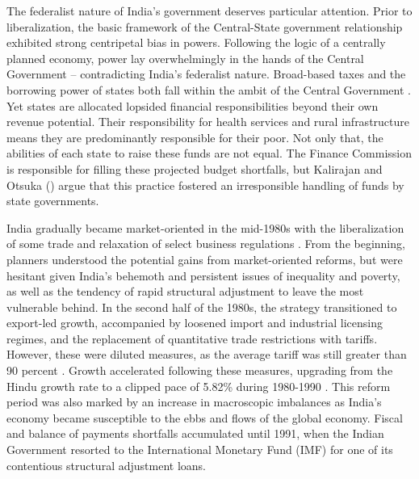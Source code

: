 \documentclass[a4paper, 11pt]{article}
\begin{document}
The federalist nature of India’s government deserves particular attention.  Prior to liberalization, the basic framework of the Central-State government relationship exhibited strong centripetal bias in powers.  Following the logic of a centrally planned economy, power lay overwhelmingly in the hands of the Central Government -- contradicting India’s federalist nature.  Broad-based taxes and the borrowing power of states both fall within the ambit of the Central Government \citep{kalirajan_fiscal_2012}.  Yet states are allocated lopsided financial responsibilities beyond their own revenue potential.  Their responsibility for health services and rural infrastructure means they are predominantly responsible for their poor.  Not only that, the abilities of each state to raise these funds are not equal.  The Finance Commission is responsible for filling these projected budget shortfalls, but Kalirajan and Otsuka (\citeyear{kalirajan_fiscal_2012}) argue that this practice fostered an irresponsible handling of funds by state governments.\par
India gradually became market-oriented in the mid-1980s with the liberalization of some trade and relaxation of select business regulations \citep{kalra_growth_2010}.  From the beginning, planners understood the potential gains from market-oriented reforms, but were hesitant given India’s behemoth and persistent issues of inequality and poverty, as well as the tendency of rapid structural adjustment to leave the most vulnerable behind.  In the second half of the 1980s, the strategy transitioned to export-led growth, accompanied by loosened import and industrial licensing regimes, and the replacement of quantitative trade restrictions with tariffs.  However, these were diluted measures, as the average tariff was still greater than 90 percent \citep{topalova_trade_2005}.  Growth accelerated following these measures, upgrading from the Hindu growth rate to a clipped pace of 5.82\% during 1980-1990 \citep{ghosh_regional_2012}.  This reform period was also marked by an increase in macroscopic imbalances as India's economy became susceptible to the ebbs and flows of the global economy.  Fiscal and balance of payments shortfalls accumulated until 1991, when the Indian Government resorted to the International Monetary Fund (IMF) for one of its contentious structural adjustment loans.\par
\end{document}
